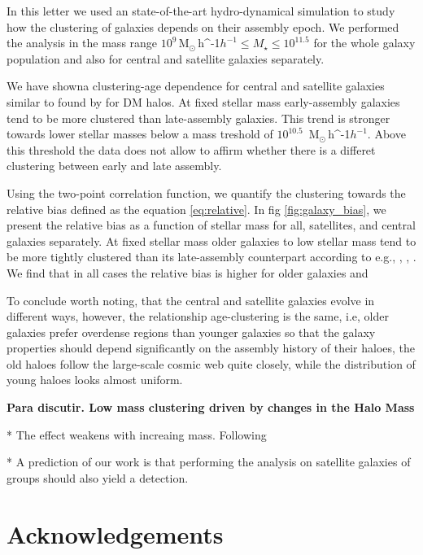 \documentclass[fleqn,usenatbib]{mnras}
\newcommand{\Msunh}{\,{\rm M}$_{\odot}$\,\ifmmode h^{-1}\else $h^{-1}$\fi}
\begin{document}
In this letter we used an state-of-the-art hydro-dynamical simulation
to study how the clustering of galaxies depends on their assembly
epoch.
We performed the analysis in the mass range $10^{9}$\Msunh $\leq
M_{\star} \leq 10^{11.5}$ for the whole galaxy population and also for 
central and satellite galaxies separately.

We have showna clustering-age  dependence for central and
satellite galaxies similar to found by \citet{2005MNRAS.363L..66G}
for DM halos. 
At fixed stellar mass early-assembly galaxies tend to be more
clustered than late-assembly galaxies.
This trend is stronger towards lower stellar masses below a mass
treshold of $10^{10.5}$
\Msunh. 
Above this threshold the data does not allow to affirm whether there
is a differet clustering between early and late assembly. 


Using the two-point correlation function, we quantify the clustering
towards the relative bias defined as the equation
\ref{eq:relative}. In fig \ref{fig:galaxy_bias}, we present the
relative bias as a function of stellar mass for all, satellites, and
central galaxies separately. At fixed stellar mass older galaxies to
low stellar mass tend to be more tightly clustered than its
late-assembly counterpart according to e.g., \citep{Lacerna_2014},
\citep{2013MNRAS.433..515W}, \citep{2009MNRAS.394.2229Z}. We find that
in all cases the relative bias is higher for older galaxies and 


To conclude worth noting, that the central and satellite galaxies
evolve in different ways, however, the relationship age-clustering is
the same, i.e, older galaxies prefer overdense regions than younger
galaxies so that the galaxy properties should depend significantly on
the assembly history of their haloes, the old haloes follow the
large-scale cosmic web quite closely, while the distribution of young
haloes looks almost uniform. 


\textbf{Para discutir. Low mass clustering driven by changes in the Halo Mass}

* The effect weakens with increaing mass. Following 

* A prediction of our work is that performing the analysis on
satellite galaxies of groups should also yield a detection.

\section*{Acknowledgements}








\bsp	%
\label{lastpage}
\end{document}
